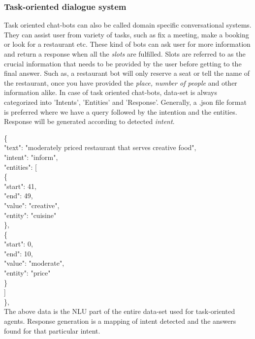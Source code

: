 \documentclass[a4paper,12pt]{article}
\begin{document}
\subsubsection{Task-oriented dialogue system}
Task oriented chat-bots can also be called domain specific conversational systems. They can assist user from variety of tasks, such as fix a meeting, make a booking or look for a restaurant etc. These kind of bots can ask user for more information and return a response when all the \textit{slots} are fulfilled. Slots are referred to as the crucial information that needs to be provided by the user before getting to the final answer. Such as, a restaurant bot will only reserve a seat or tell the name of the restaurant, once you have provided the \textit{place, number of people} and other information alike. In case of task oriented chat-bots, data-set is always categorized into 'Intents', 'Entities' and 'Response'. Generally, a .json file format is preferred where we have a query followed by the intention and the entities. Response will be generated according to detected \textit{intent}. 


     \{\\
        "text":   "\textcolor{mypink3}{moderately priced restaurant that serves creative food}", \\
        "intent": "\textcolor{mypink3}{inform}", \\
        "entities": [\\
          \{\\
            "start": \textcolor{mypink3}{41},\\ 
            "end": \textcolor{mypink3}{49}, \\
            "value": "creative", \\
            "entity": "cuisine"\\
          \},\\
          \{\\
            "start":\textcolor{mypink3}{ 0},\\ 
            "end": \textcolor{mypink3}{10},\\
            "value": "moderate", \\
            "entity": "price"\\
          \}\\
        ]\\
     \},\\


The above data is the NLU part of the entire data-set used for task-oriented agents. Response generation is a mapping of intent detected and the answers found for that particular intent.
\end{document}

